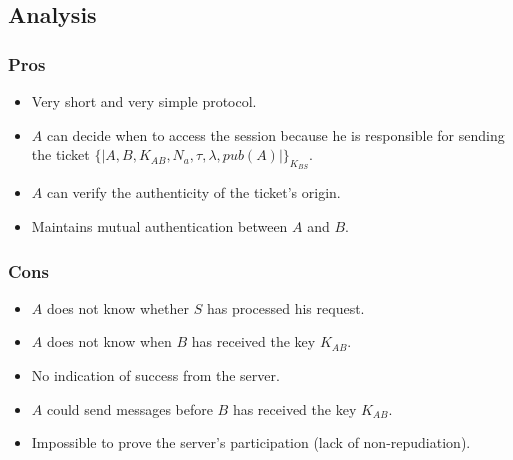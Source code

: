 \subsection{Analysis}

\subsubsection{Pros}
\begin{itemize}
    \item Very short and very simple protocol.
    \item $A$ can decide when to access the session because he is responsible for sending the ticket $\{|A,B,K_{AB},N_a, \tau, \lambda, pub(A) |\}_{K_{BS}}$.
    \item $A$ can verify the authenticity of the ticket’s origin.
    \item Maintains mutual authentication between $A$ and $B$.
\end{itemize}

\subsubsection{Cons}
\begin{itemize}
    \item $A$ does not know whether $S$ has processed his request.
    \item $A$ does not know when $B$ has received the key $K_{AB}$.
    \item No indication of success from the server.
    \item $A$ could send messages before $B$ has received the key $K_{AB}$.
    \item Impossible to prove the server’s participation (lack of non-repudiation).
\end{itemize}
